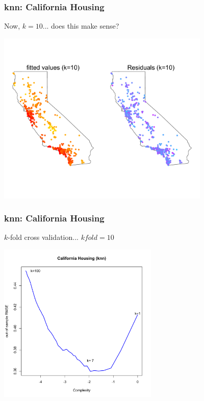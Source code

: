 \documentclass[flegn]{beamer}
\begin{document}
\begin{frame}
\frametitle{knn: California Housing}
Now, $k=10$... does this make sense?
\vspace{-0.8cm}
\begin{center}
\includegraphics[width=4in]{CAL10}
\end{center}
\end{frame}


\begin{frame}
\frametitle{knn: California Housing}
$k$-fold cross validation... $kfold=10$
\begin{center}
\includegraphics[width=3in]{CALknn} 
\end{center}
\end{frame}
\end{document}
